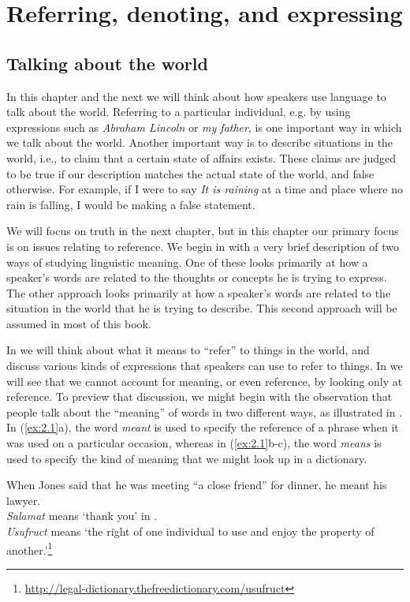 \chapter{Referring, denoting, and expressing}\label{sec:2}

\section{Talking about the world}\label{sec:2.1}
\largerpage[2]
In this chapter and the next we will think about how speakers use language to talk about the world. Referring to a particular individual, e.g. by using expressions such as \textit{Abraham Lincoln} or \textit{my father}, is one important way in which we talk about the world. Another important way is to describe situations in the world, i.e., to claim that a certain state of affairs exists. These claims are judged to be true if our description matches the actual state of the world, and false otherwise. For example, if I were to say \textit{It is raining} at a time and place where no rain is falling, I would be making a false statement.

We will focus on truth in the next chapter, but in this chapter our primary focus is on issues relating to reference. We begin in  with a very brief description of two ways of studying linguistic meaning. One of these looks primarily at how a speaker’s words are related to the thoughts or concepts he is trying to express. The other approach looks primarily at how a speaker’s words are related to the situation in the world that he is trying to describe. This second approach will be assumed in most of this book.

In  we will think about what it means to “refer” to things in the world, and discuss various kinds of expressions that speakers can use to refer to things. In  we will see that we cannot account for meaning, or even reference, by looking only at reference. To preview that discussion, we might begin with the observation that people talk about the “meaning” of words in two different ways, as illustrated in . In (\ref{ex:2.1}a), the word \textit{meant} is used to specify the reference of a phrase when it was used on a particular occasion, whereas in (\ref{ex:2.1}b-c), the word \textit{means} is used to specify the kind of meaning that we might look up in a dictionary.


\ea \label{ex:2.1}
\ea When Jones said that he was meeting “a close friend” for dinner, he meant his lawyer.\\
\ex \textit{Salamat} means ‘thank you’ in .\\
\ex \textit{Usufruct} means ‘the right of one individual to use and enjoy the property of another.’\footnote{\url{http://legal-dictionary.thefreedictionary.com/usufruct}}
\z
\z


